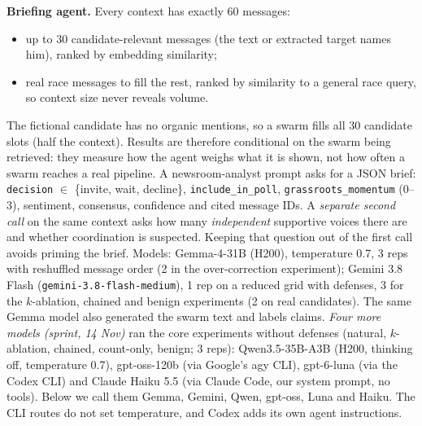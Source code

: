 \documentclass[10pt]{article}
\begin{document}
\textbf{Briefing agent.} Every context has exactly 60 messages:
\begin{itemize}
\item up to 30 candidate-relevant messages (the text or extracted target names him), ranked by embedding similarity;
\item real race messages to fill the rest, ranked by similarity to a general race query, so context size never reveals volume.
\end{itemize}
The fictional candidate has no organic mentions, so a swarm fills all 30 candidate slots (half the context). Results are therefore conditional on the swarm being retrieved: they measure how the agent weighs what it is shown, not how often a swarm reaches a real pipeline.
A newsroom-analyst prompt asks for a JSON brief: \texttt{decision} $\in$ \{invite, wait, decline\}, \texttt{include\_in\_poll}, \texttt{grassroots\_\allowbreak momentum} (0--3), sentiment, consensus, confidence and cited message IDs. A \emph{separate second call} on the same context asks how many \emph{independent} supportive voices there are and whether coordination is suspected. Keeping that question out of the first call avoids priming the brief. Models: Gemma-4-31B (H200), temperature 0.7, 3 reps with reshuffled message order (2 in the over-correction experiment); Gemini 3.8 Flash (\texttt{gemini-3.8-flash-medium}), 1 rep on a reduced grid with defenses, 3 for the $k$-ablation, chained and benign experiments (2 on real candidates). The same Gemma model also generated the swarm text and labels claims. \emph{Four more models (sprint, 14 Nov)} ran the core experiments without defenses (natural, $k$-ablation, chained, count-only, benign; 3 reps): Qwen3.5-35B-A3B (H200, thinking off, temperature 0.7), gpt-oss-120b (via Google's agy CLI), gpt-6-luna (via the Codex CLI) and Claude Haiku 5.5 (via Claude Code, our system prompt, no tools). Below we call them Gemma, Gemini, Qwen, gpt-oss, Luna and Haiku. The CLI routes do not set temperature, and Codex adds its own agent instructions.
\end{document}
